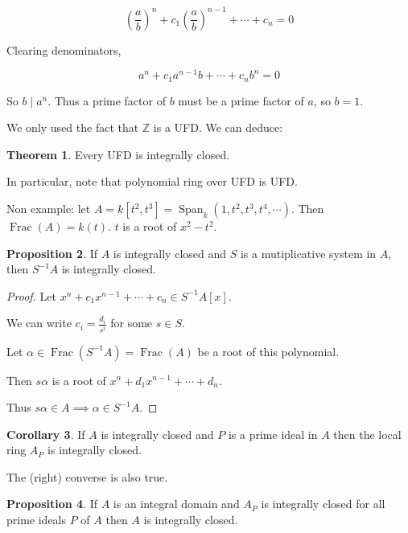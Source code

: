 \documentclass{article}
\theoremstyle{definition}
\newtheorem{theorem}{Theorem}
\newtheorem{proposition}[theorem]{Proposition}
\newtheorem{corollary}[theorem]{Corollary}
\begin{document}
    \[
        \left( \frac{a}{b} \right)^n + c_1 \left( \frac{a}{b} \right)^{n-1} + \cdots + c_n = 0
    \]

    Clearing denominators,

    \[
        a^n + c_1 a^{n-1} b + \cdots + c_n b^n = 0
    \]

    So \(b\mid a^n\). Thus a prime factor of \(b\) must be a prime factor of \(a\), so \(b=1\).

    We only used the fact that \(\mathbb{Z}\) is a UFD. We can deduce:

    \begin{theorem}
        Every UFD is integrally closed.
    \end{theorem}

    In particular, note that polynomial ring over UFD is UFD.

    Non example: let \(A = k[t^2, t^3] = \operatorname{Span}_k (1, t^2, t^3, t^4, \cdots)\). Then \(\operatorname{Frac} (A) = k(t)\). \(t\) is a root of \(x^2 - t^2\).

    \begin{proposition}
        If \(A\) is integrally closed and \(S\) is a mutiplicative system in \(A\), then \(S ^{-1} A\) is integrally closed.
    \end{proposition}

    \begin{proof}
        Let \(x^n + c_1 x^{n-1} + \cdots + c_n \in S ^{-1} A [x]\).

        We can write \(c_i = \frac{d_i}{s^i}\) for some \(s\in S\).

        Let \(\alpha \in \operatorname{Frac} (S ^{-1} A) = \operatorname{Frac} (A)\) be a root of this polynomial.

        Then \(s \alpha\) is a root of \(x^n + d_1 x^{n-1} + \cdots + d_n\).

        Thus \(s \alpha \in A \implies \alpha \in S ^{-1} A\).
    \end{proof}

    \begin{corollary}
        If \(A\) is integrally closed and \(P\) is a prime ideal in \(A\) then the local ring \(A_P\) is integrally closed.
    \end{corollary}

    The (right) converse is also true.

    \begin{proposition}
        If \(A\) is an integral domain and \(A_P\) is integrally closed for all prime ideals \(P\) of \(A\) then \(A\) is integrally closed. 
    \end{proposition}
\end{document}
